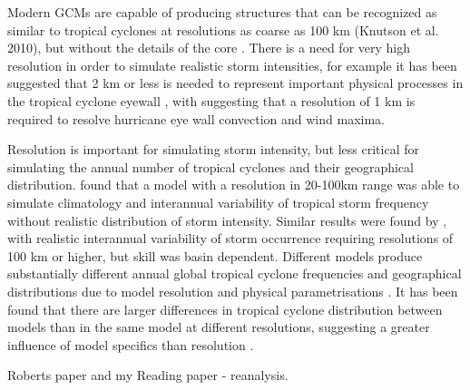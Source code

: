 Modern GCMs are capable of producing structures that can be recognized as similar to tropical cyclones at resolutions as coarse as 100 km (Knutson et al. 2010), but without the details of the core \citep{mcdonald2005tropical}. There is a need for very high resolution in order to simulate realistic storm intensities, \citep{bender2010modeled, emanuel2008hurricanes} for example it has been suggested that 2 km or less is needed to represent important physical processes in the tropical cyclone eyewall \citep{gentry2010sensitivity}, with \cite{chen2007cblast} suggesting that a resolution of 1 km is required to resolve hurricane eye wall convection and wind maxima.


Resolution is important for simulating storm intensity, but less critical for simulating the annual number of tropical cyclones and their geographical distribution. \cite{zhao2009simulations} found that a model with a resolution in 20-100km range was able to simulate climatology and interannual variability of tropical storm frequency without realistic distribution of storm intensity. Similar results were found by \cite{strachan2013investigating}, with realistic interannual variability of storm occurrence requiring resolutions of 100 km or higher, but skill was basin dependent. Different models produce substantially different annual global tropical cyclone frequencies and geographical distributions due to model resolution and physical parametrisations \citep{zhao2013robust}. It has been found that there are larger differences in tropical cyclone distribution between models than in the same model at different resolutions, suggesting a greater influence of model specifics than resolution \citep{shaevitz2014characteristics}.

Roberts paper and my Reading paper - reanalysis.







